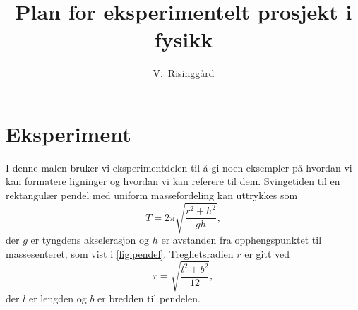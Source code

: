 


\begin{frontmatter}

\title{Plan for eksperimentelt prosjekt i fysikk}

\author[fysikk]{V.~Risinggård}
\address[fysikk]{Institutt for fysikk, Norges teknisk-naturvitenskapelige universitet, 7491 Trondheim.}

\end{frontmatter}


\section{Eksperiment}
I denne malen bruker vi eksperimentdelen til å gi noen eksempler på hvordan vi kan formatere ligninger og hvordan vi kan referere til dem. Svingetiden til en rektangulær pendel med uniform massefordeling kan uttrykkes som 
\begin{equation}
T=2\pi\sqrt{\frac{r^2+h^2}{gh}},
\label{eq:svingetid} %
\end{equation}
der $g$ er tyngdens akselerasjon og $h$ er avstanden fra opphengspunktet til massesenteret, som vist i \autoref{fig:pendel}. Treghetsradien $r$ er gitt ved
\begin{equation}
r=\sqrt{\frac{l^2+b^2}{12}},
\label{eq:treghetsradius}
\end{equation}
der $l$ er lengden og $b$ er bredden til pendelen.


